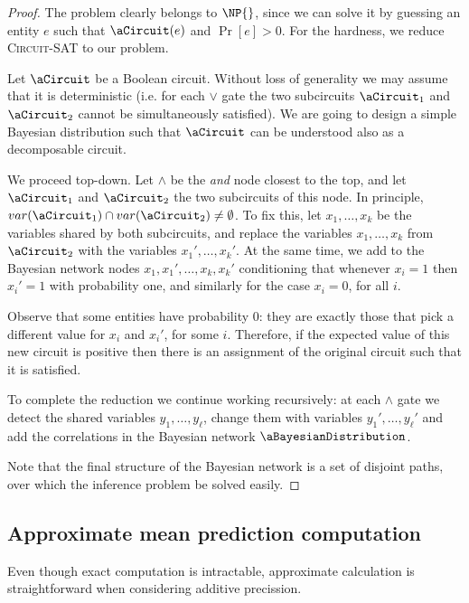 \begin{proof}
    The problem clearly belongs to $\NP{}$, since we can solve it by guessing an entity $e$ such that $\aCircuit(e)$ and $\Pr[e] > 0$. For the hardness, we reduce \textsc{Circuit-SAT} to our problem.

    Let $\aCircuit$ be a Boolean circuit. Without loss of generality we may assume that it is deterministic (i.e. for each $\vee$ gate the two subcircuits $\aCircuit_1$ and $\aCircuit_2$ cannot be simultaneously satisfied). We are going to design a simple Bayesian distribution such that $\aCircuit$ can be understood also as a decomposable circuit.

    We proceed top-down. Let $\wedge$ be the \textit{and} node closest to the top, and let $\aCircuit_1$ and $\aCircuit_2$ the two subcircuits of this node. In principle, $var(\aCircuit_1) \cap var(\aCircuit_2) \neq \emptyset$. To fix this, let $x_1,\ldots, x_k$ be the variables shared by both subcircuits, and replace the variables $x_1,\ldots,x_k$ from $\aCircuit_2$ with the variables $x_1',\ldots,x_k'$. At the same time, we add to the Bayesian network nodes $x_1,x_1',\ldots,x_k,x_k'$ conditioning that whenever $x_i = 1$ then $x_i'=1$ with probability one, and similarly for the case $x_i = 0$, for all $i$.

    Observe that some entities have probability 0: they are exactly those that pick a different value for $x_i$ and $x_i'$, for some $i$. Therefore, if the expected value of this new circuit is positive then there is an assignment of the original circuit such that it is satisfied.

    To complete the reduction we continue working recursively: at each $\wedge$ gate we detect the shared variables $y_1,\ldots,y_\ell$, change them with variables $y_1',\ldots,y_\ell'$ and add the correlations in the Bayesian network $\aBayesianDistribution$.

    Note that the final structure of the Bayesian network is a set of disjoint paths, over which the inference problem be solved easily.
\end{proof}

\subsection{Approximate mean prediction computation}

Even though exact computation is intractable, approximate calculation is straightforward when considering additive precission.

